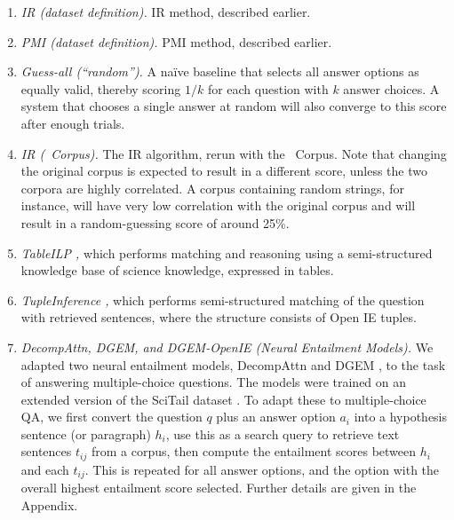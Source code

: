 \begin{enumerate}

\item \textit{IR (dataset definition).} IR method, described earlier. 

\item \textit{PMI (dataset definition).} PMI method, described earlier. 

\item \textit{Guess-all (``random'').} A na\"ive baseline that selects all answer options as equally valid, thereby scoring $1/k$ for each question with $k$ answer choices. A system that chooses a single answer at random will also converge to this score after enough trials.

\item \textit{IR (\ASC~Corpus).} The IR algorithm, rerun with the \ASC~Corpus. Note that changing the original corpus is expected to result in a different score, unless the two corpora are highly correlated. A corpus containing random strings, for instance, will have very low correlation with the original corpus and will result in a random-guessing score of around 25\%.

\item \textit{TableILP \cite{khashabi2016tableilp},} which performs matching and reasoning using a semi-structured knowledge base of science knowledge, expressed in tables.

\item \textit{TupleInference \cite{khot2017tupleinf},} which performs semi-structured matching of the question with retrieved sentences, where the structure consists of Open IE tuples.

\item \textit{DecompAttn, DGEM, and DGEM-OpenIE (Neural Entailment Models).} We adapted two neural entailment models, DecompAttn \cite{parikh2016decomposable} and DGEM \cite{khot2018scitail}, to the task of answering multiple-choice questions. The models were trained on an extended version of the SciTail dataset \cite{khot2018scitail}. To adapt these to multiple-choice QA, we first convert the question $q$ plus an answer option $a_{i}$ into a hypothesis sentence (or paragraph) $h_{i}$, use this as a search query to retrieve text sentences $t_{ij}$ from a corpus, then compute the entailment scores between $h_{i}$ and each $t_{ij}$. This is repeated for all answer options, and the option with the overall highest entailment score selected. Further details are given in the Appendix. 


\end{enumerate}
